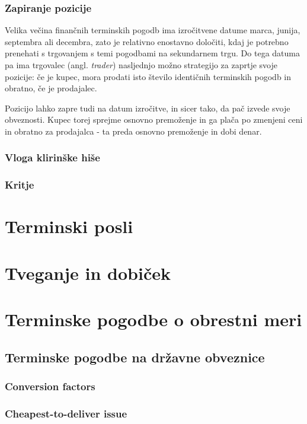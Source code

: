 \documentclass[a4paper, 12pt]{article}
\begin{document}
\subsubsection{Zapiranje pozicije}
Velika večina finančnih terminskih pogodb ima izročitvene datume marca, junija, septembra ali 
decembra, zato je relativno enostavno določiti, kdaj je potrebno prenehati s trgovanjem s temi 
pogodbami na sekundarnem trgu. Do tega datuma pa ima trgovalec (angl. \textit{trader}) nasljednjo
možno strategijo za zaprtje svoje pozicije: če je kupec, mora prodati isto število identičnih
terminskih pogodb in obratno, če je prodajalec.

Pozicijo lahko zapre tudi na datum izročitve, in sicer tako, da pač izvede svoje obveznosti. 
Kupec torej sprejme osnovno premoženje in ga plača po zmenjeni ceni in obratno za prodajalca - 
ta preda osnovno premoženje in dobi denar. 

\subsubsection{Vloga klirinške hiše}
\subsubsection{Kritje}

\section{Terminski posli}

\section{Tveganje in dobiček}

\section{Terminske pogodbe o obrestni meri}
\subsection{Terminske pogodbe na državne obveznice}
\subsubsection{Conversion factors}
\subsubsection{Cheapest-to-deliver issue}
\end{document}
